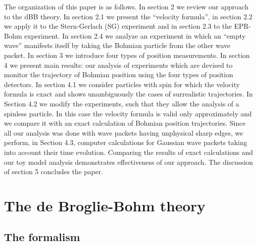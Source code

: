 \documentclass[12pt,preprint,tightenlines]{elsarticle}
\begin{document}
 The organization
of this paper is as follows. In section 2 we review
our approach to the dBB theory. In section 2.1 we present the ``velocity formula'',
in section 2.2 we apply it to the Stern-Gerlach (SG) experiment and in
section 2.3 to the EPR-Bohm experiment. In section 2.4 we analyze an
experiment in which an ``empty wave'' manifests itself by taking
the Bohmian particle from the other wave packet. In section 3 we
introduce four types of position measurements. In section 4 we present main results: our  analysis of
experiments which are devised  to monitor the trajectory of Bohmian position
 using the four types of position detectors.
In section 4.1 we consider particles with spin for which  the velocity formula is exact and shows unambiguously
the cases of surrealistic trajectories. In Section 4.2 we modify
the experiments, such that they allow the analysis of a spinless particle.
In this case the velocity formula is valid only approximately and
we compare it with an exact calculation of Bohmian position trajectories.
Since all our analysis was done with wave packets having unphysical
sharp edges, we perform, in Section 4.3, computer calculations for Gaussian
wave packets taking into account their time evolution. Comparing the
results of exact calculations and our toy model analysis demonstrates
effectiveness of our approach. The discussion of section 5 concludes
the paper.


\section{ The de Broglie-Bohm theory}


\subsection{The formalism}
\end{document}

